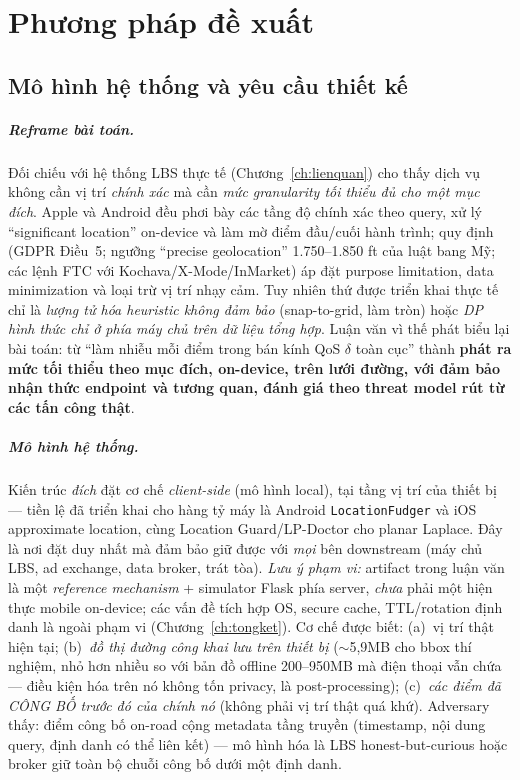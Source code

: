 \chapter{Phương pháp đề xuất}
\label{ch:phuongphap}

\section{Mô hình hệ thống và yêu cầu thiết kế}
\label{sec:systemmodel}

\paragraph{Reframe bài toán.} Đối chiếu với hệ thống LBS thực tế
(Chương~\ref{ch:lienquan}) cho thấy dịch vụ không cần vị trí \emph{chính xác} mà
cần \emph{mức granularity tối thiểu đủ cho một mục đích}. Apple và Android đều
phơi bày các tầng độ chính xác theo query, xử lý ``significant location''
on-device và làm mờ điểm đầu/cuối hành trình; quy định (GDPR Điều~5; ngưỡng
``precise geolocation'' 1.750--1.850 ft của luật bang Mỹ; các lệnh FTC với
Kochava/X-Mode/InMarket) áp đặt purpose limitation, data minimization và loại trừ
vị trí nhạy cảm. Tuy nhiên thứ được triển khai thực tế chỉ là \emph{lượng tử hóa
heuristic không đảm bảo} (snap-to-grid, làm tròn) hoặc \emph{DP hình thức chỉ ở
phía máy chủ trên dữ liệu tổng hợp}. Luận văn vì thế phát biểu lại bài toán: từ
``làm nhiễu mỗi điểm trong bán kính QoS $\delta$ toàn cục'' thành \textbf{phát ra
mức tối thiểu theo mục đích, on-device, trên lưới đường, với đảm bảo nhận thức
endpoint và tương quan, đánh giá theo threat model rút từ các tấn công thật}.

\paragraph{Mô hình hệ thống.} Kiến trúc \emph{đích} đặt cơ chế \emph{client-side}
(mô hình local), tại tầng vị trí của thiết bị --- tiền lệ đã triển khai cho hàng
tỷ máy là Android \texttt{LocationFudger} và iOS approximate location, cùng
Location Guard/LP-Doctor cho planar Laplace. Đây là nơi đặt duy nhất mà đảm bảo
giữ được với \emph{mọi} bên downstream (máy chủ LBS, ad exchange, data broker,
trát tòa). \emph{Lưu ý phạm vi:} artifact trong luận văn là một \emph{reference
mechanism} + simulator Flask phía server, \emph{chưa} phải một hiện thực mobile
on-device; các vấn đề tích hợp OS, secure cache, TTL/rotation định danh là ngoài
phạm vi (Chương~\ref{ch:tongket}). Cơ chế được biết: (a)~vị trí thật hiện tại;
(b)~\emph{đồ thị đường công khai lưu trên thiết bị} ($\sim$5,9MB cho bbox thí
nghiệm, nhỏ hơn nhiều so với bản đồ offline 200--950MB mà điện thoại vẫn chứa ---
điều kiện hóa trên nó không tốn privacy, là post-processing); (c)~\emph{các điểm
đã CÔNG BỐ trước đó của chính nó} (không phải vị trí thật quá khứ). Adversary
thấy: điểm công bố on-road cộng metadata tầng truyền (timestamp, nội dung query,
định danh có thể liên kết) --- mô hình hóa là LBS honest-but-curious hoặc broker
giữ toàn bộ chuỗi công bố dưới một định danh.


